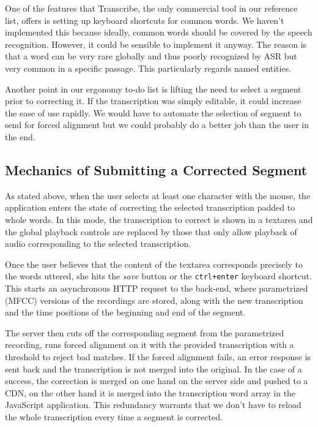\documentclass{svproc}
\begin{document}
One of the features that Transcribe, the only commercial tool in our reference
list, offers is setting up keyboard shortcuts for common words. We haven't
implemented this because ideally, common words should be covered by the speech
recognition. However, it could be sensible to implement it anyway. The reason is
that a word can be very rare globally and thus poorly recognized by ASR but very
common in a specific passage. This particularly regards named entities.

Another point in our ergonomy to-do list is lifting the need to select a segment
prior to correcting it. If the transcription was simply editable, it could
increase the ease of use rapidly. We would have to automate the selection of
segment to send for forced alignment but we could probably do a better job than
the user in the end.

\subsection{Mechanics of Submitting a Corrected Segment}

As stated above, when the user selects at least one character with the mouse,
the application enters the state of correcting the selected transcription padded
to whole words. In this mode, the transcription to correct is shown in a
textarea and the global playback controls are replaced by those that only allow
playback of audio corresponding to the selected transcription.

Once the user believes that the content of the textarea corresponds precisely
to the words uttered, she hits the {\em save} button or the \texttt{ctrl+enter}
keyboard shortcut. This starts an asynchronous HTTP request to the back-end,
where parametrized (MFCC) versions of the recordings are stored, along with the
new transcription and the time positions of the beginning and end of the
segment.

The server then cuts off the corresponding segment from the parametrized
recording, runs forced alignment on it with the provided transcription with a
threshold to reject bad matches. If the forced alignment fails, an error
response is sent back and the transcription is not merged into the original. In
the case of a success, the correction is merged on one hand on the server side
and pushed to a CDN, on the other hand it is merged into the transcription word
array in the JavaScript application. This redundancy warrants that we don't have
to reload the whole transcription every time a segment is corrected.
\end{document}
